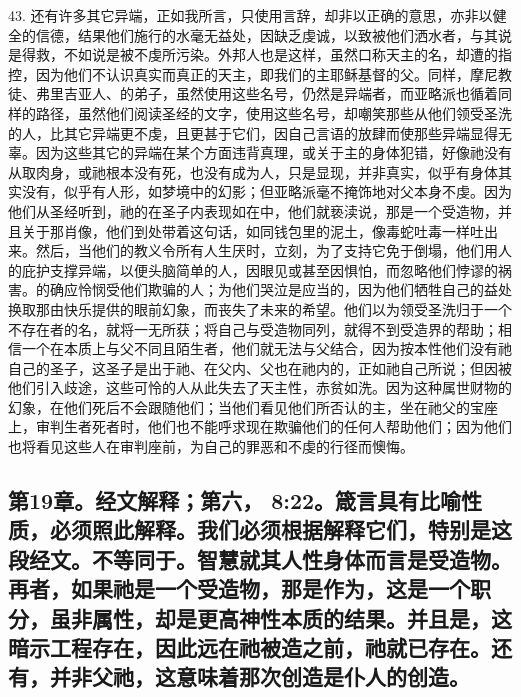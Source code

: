 43. 还有许多其它异端，正如我所言，只使用言辞，却非以正确的意思，亦非以健全的信德，结果他们施行的水毫无益处，因缺乏虔诚，以致被他们洒水者，与其说是得救，不如说是被不虔所污染。外邦人也是这样，虽然口称天主的名，却遭的指控，因为他们不认识真实而真正的天主，即我们的主耶稣基督的父。同样，摩尼教徒、弗里吉亚人、的弟子，虽然使用这些名号，仍然是异端者，而亚略派也循着同样的路径，虽然他们阅读圣经的文字，使用这些名号，却嘲笑那些从他们领受圣洗的人，比其它异端更不虔，且更甚于它们，因自己言语的放肆而使那些异端显得无辜。因为这些其它的异端在某个方面违背真理，或关于主的身体犯错，好像祂没有从取肉身，或祂根本没有死，也没有成为人，只是显现，并非真实，似乎有身体其实没有，似乎有人形，如梦境中的幻影；但亚略派毫不掩饰地对父本身不虔。因为他们从圣经听到，祂的在圣子内表现如在中，他们就亵渎说，那是一个受造物，并且关于那肖像，他们到处带着这句话，如同钱包里的泥土，像毒蛇吐毒一样吐出来。然后，当他们的教义令所有人生厌时，立刻，为了支持它免于倒塌，他们用人的庇护支撑异端，以便头脑简单的人，因眼见或甚至因惧怕，而忽略他们悖谬的祸害。的确应怜悯受他们欺骗的人；为他们哭泣是应当的，因为他们牺牲自己的益处换取那由快乐提供的眼前幻象，而丧失了未来的希望。他们以为领受圣洗归于一个不存在者的名，就将一无所获；将自己与受造物同列，就得不到受造界的帮助；相信一个在本质上与父不同且陌生者，他们就无法与父结合，因为按本性他们没有祂自己的圣子，这圣子是出于祂、在父内、父也在祂内的，正如祂自己所说；但因被他们引入歧途，这些可怜的人从此失去了天主性，赤贫如洗。因为这种属世财物的幻象，在他们死后不会跟随他们；当他们看见他们所否认的主，坐在祂父的宝座上，审判生者死者时，他们也不能呼求现在欺骗他们的任何人帮助他们；因为他们也将看见这些人在审判座前，为自己的罪恶和不虔的行径而懊悔。\par


\subsection{第19章。经文解释；第六， 8:22。箴言具有比喻性质，必须照此解释。我们必须根据解释它们，特别是这段经文。不等同于。智慧就其人性身体而言是受造物。再者，如果祂是一个受造物，那是作为，这是一个职分，虽非属性，却是更高神性本质的结果。并且是，这暗示工程存在，因此远在祂被造之前，祂就已存在。还有，并非父祂，这意味着那次创造是仆人的创造。}

